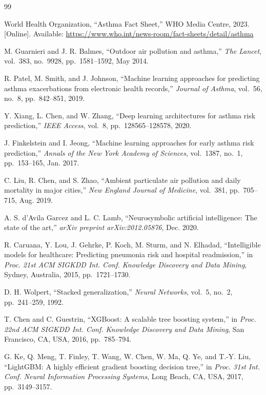 \documentclass[11pt,a4paper]{article}
\begin{document}

\begin{thebibliography}{99}

World Health Organization, ``Asthma Fact Sheet,'' WHO Media Centre, 2023.
[Online]. Available: \url{https://www.who.int/news-room/fact-sheets/detail/asthma}

M. Guarnieri and J. R. Balmes, ``Outdoor air pollution and asthma,''
\textit{The Lancet}, vol.~383, no.~9928, pp.~1581--1592, May 2014.

R. Patel, M. Smith, and J. Johnson, ``Machine learning approaches for predicting
asthma exacerbations from electronic health records,''
\textit{Journal of Asthma}, vol.~56, no.~8, pp.~842--851, 2019.

Y. Xiang, L. Chen, and W. Zhang, ``Deep learning architectures for asthma risk
prediction,'' \textit{IEEE Access}, vol.~8, pp.~128565--128578, 2020.

J. Finkelstein and I. Jeong, ``Machine learning approaches for early asthma risk
prediction,'' \textit{Annals of the New York Academy of Sciences},
vol.~1387, no.~1, pp.~153--165, Jan. 2017.

C. Liu, R. Chen, and S. Zhao, ``Ambient particulate air pollution and daily
mortality in major cities,'' \textit{New England Journal of Medicine},
vol.~381, pp.~705--715, Aug. 2019.

A. S. d'Avila Garcez and L. C. Lamb, ``Neurosymbolic artificial intelligence:
The state of the art,'' \textit{arXiv preprint arXiv:2012.05876}, Dec. 2020.

R. Caruana, Y. Lou, J. Gehrke, P. Koch, M. Sturm, and N. Elhadad, ``Intelligible
models for healthcare: Predicting pneumonia risk and hospital readmission,'' in
\textit{Proc. 21st ACM SIGKDD Int. Conf. Knowledge Discovery and Data Mining},
Sydney, Australia, 2015, pp.~1721--1730.

D. H. Wolpert, ``Stacked generalization,'' \textit{Neural Networks},
vol.~5, no.~2, pp.~241--259, 1992.

T. Chen and C. Guestrin, ``XGBoost: A scalable tree boosting system,'' in
\textit{Proc. 22nd ACM SIGKDD Int. Conf. Knowledge Discovery and Data Mining},
San Francisco, CA, USA, 2016, pp.~785--794.

G. Ke, Q. Meng, T. Finley, T. Wang, W. Chen, W. Ma, Q. Ye, and T.-Y. Liu,
``LightGBM: A highly efficient gradient boosting decision tree,'' in
\textit{Proc. 31st Int. Conf. Neural Information Processing Systems},
Long Beach, CA, USA, 2017, pp.~3149--3157.


\end{thebibliography}
\end{document}
